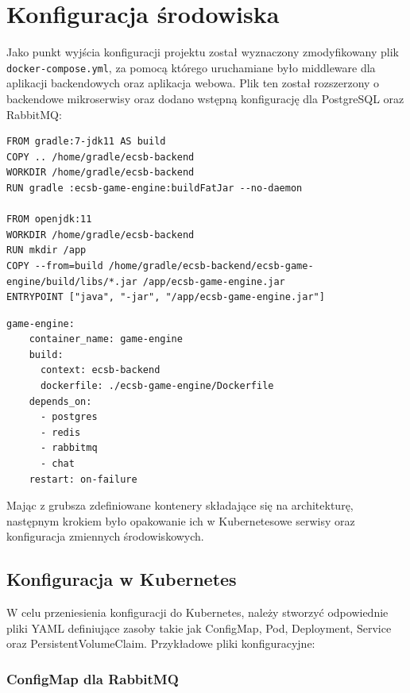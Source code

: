 \documentclass[polish]{aghengthesis}
\begin{document}
\chapter{Konfiguracja środowiska}
\label{sec:konfiguracja-srodowiska}

Jako punkt wyjścia konfiguracji projektu został wyznaczony zmodyfikowany plik \texttt{docker-compose.yml}, za pomocą którego uruchamiane było middleware dla aplikacji backendowych oraz aplikacja webowa. Plik ten został rozszerzony o backendowe mikroserwisy oraz dodano wstępną konfigurację dla PostgreSQL oraz RabbitMQ:

\begin{lstlisting}[caption=Przykład pliku Dockerfile dla mikroserwisu]
FROM gradle:7-jdk11 AS build
COPY .. /home/gradle/ecsb-backend
WORKDIR /home/gradle/ecsb-backend
RUN gradle :ecsb-game-engine:buildFatJar --no-daemon

FROM openjdk:11
WORKDIR /home/gradle/ecsb-backend
RUN mkdir /app
COPY --from=build /home/gradle/ecsb-backend/ecsb-game-engine/build/libs/*.jar /app/ecsb-game-engine.jar
ENTRYPOINT ["java", "-jar", "/app/ecsb-game-engine.jar"]
\end{lstlisting}

\begin{lstlisting}[caption=Przykładowa definicja kontenera mikroserwisu w pliku docker-compose.yml]
game-engine:
    container_name: game-engine
    build:
      context: ecsb-backend
      dockerfile: ./ecsb-game-engine/Dockerfile
    depends_on:
      - postgres
      - redis
      - rabbitmq
      - chat
    restart: on-failure
\end{lstlisting}

Mając z grubsza zdefiniowane kontenery składające się na architekturę, następnym krokiem było opakowanie ich w Kubernetesowe serwisy oraz konfiguracja zmiennych środowiskowych.

\section{Konfiguracja w Kubernetes}

W celu przeniesienia konfiguracji do Kubernetes, należy stworzyć odpowiednie pliki YAML definiujące zasoby takie jak ConfigMap, Pod, Deployment, Service oraz PersistentVolumeClaim. Przykładowe pliki konfiguracyjne:

\subsection{ConfigMap dla RabbitMQ}
\end{document}
